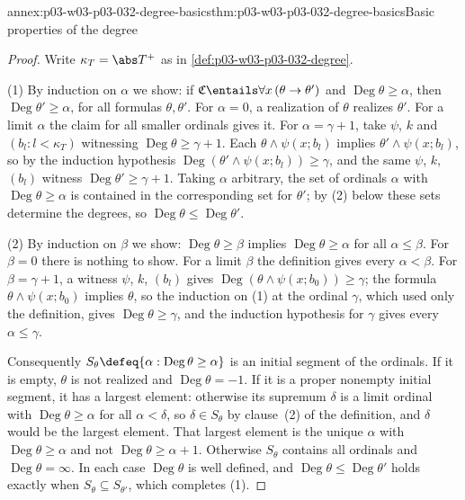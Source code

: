 \begin{annexitem}{annex:p03-w03-p03-032-degree-basics}{thm:p03-w03-p03-032-degree-basics}{Basic properties of the degree}
\begin{proof}
Write \(\kappa_T=\abs T^+\) as in \cref{def:p03-w03-p03-032-degree}.

(1) By induction on \(\alpha\) we show: if
\(\mathfrak C\entails\forall x\,(\theta\to\theta')\) and
\(\operatorname{Deg}\theta\geq\alpha\), then
\(\operatorname{Deg}\theta'\geq\alpha\), for all formulas
\(\theta,\theta'\).  For \(\alpha=0\), a realization of \(\theta\) realizes
\(\theta'\).  For a limit \(\alpha\) the claim for all smaller ordinals gives
it.  For \(\alpha=\gamma+1\), take \(\psi\), \(k\) and \((b_l:l<\kappa_T)\)
witnessing \(\operatorname{Deg}\theta\geq\gamma+1\).  Each
\(\theta\wedge\psi(x;b_l)\) implies \(\theta'\wedge\psi(x;b_l)\), so by the
induction hypothesis \(\operatorname{Deg}(\theta'\wedge\psi(x;b_l))\geq\gamma\),
and the same \(\psi\), \(k\), \((b_l)\) witness
\(\operatorname{Deg}\theta'\geq\gamma+1\).  Taking \(\alpha\) arbitrary, the
set of ordinals \(\alpha\) with \(\operatorname{Deg}\theta\geq\alpha\) is
contained in the corresponding set for \(\theta'\); by (2) below these sets
determine the degrees, so \(\operatorname{Deg}\theta\leq\operatorname{Deg}\theta'\).

(2) By induction on \(\beta\) we show: \(\operatorname{Deg}\theta\geq\beta\)
implies \(\operatorname{Deg}\theta\geq\alpha\) for all \(\alpha\leq\beta\).
For \(\beta=0\) there is nothing to show.  For a limit \(\beta\) the
definition gives every \(\alpha<\beta\).  For \(\beta=\gamma+1\), a witness
\(\psi\), \(k\), \((b_l)\) gives
\(\operatorname{Deg}(\theta\wedge\psi(x;b_0))\geq\gamma\); the formula
\(\theta\wedge\psi(x;b_0)\) implies \(\theta\), so the induction on (1) at
the ordinal \(\gamma\), which used only the definition, gives
\(\operatorname{Deg}\theta\geq\gamma\), and the induction hypothesis for
\(\gamma\) gives every \(\alpha\leq\gamma\).

Consequently \(S_\theta\defeq\{\alpha:\operatorname{Deg}\theta\geq\alpha\}\)
is an initial segment of the ordinals.  If it is empty, \(\theta\) is not
realized and \(\operatorname{Deg}\theta=-1\).  If it is a proper nonempty
initial segment, it has a largest element: otherwise its supremum
\(\delta\) is a limit ordinal with \(\operatorname{Deg}\theta\geq\alpha\)
for all \(\alpha<\delta\), so \(\delta\in S_\theta\) by clause~(2) of the
definition, and \(\delta\) would be the largest element.  That largest
element is the unique \(\alpha\) with \(\operatorname{Deg}\theta\geq\alpha\)
and not \(\operatorname{Deg}\theta\geq\alpha+1\).  Otherwise \(S_\theta\)
contains all ordinals and \(\operatorname{Deg}\theta=\infty\).  In each case
\(\operatorname{Deg}\theta\) is well defined, and
\(\operatorname{Deg}\theta\leq\operatorname{Deg}\theta'\) holds exactly when
\(S_\theta\subseteq S_{\theta'}\), which completes (1).


\end{proof}
\end{annexitem}
